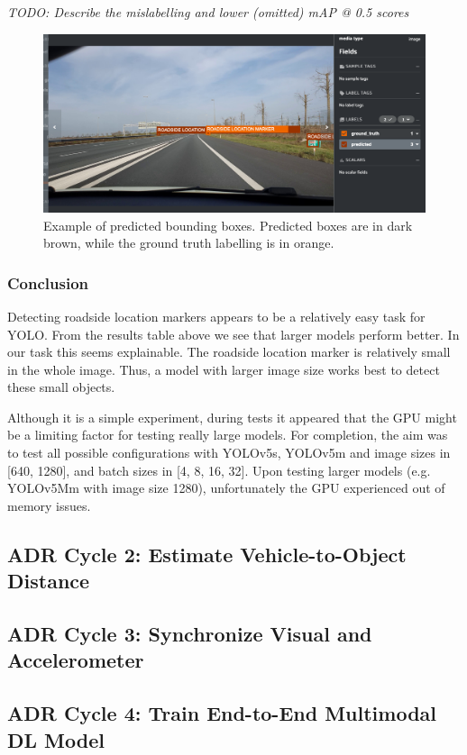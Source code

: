 \textit{TODO: Describe the mislabelling and lower (omitted) mAP @ 0.5 scores}

\begin{figure}[h]
\begin{center}
\includegraphics[width=\textwidth,keepaspectratio]{images/5_multimodal_fusion/exp-1_sample.png}
\end{center}
\caption{Example of predicted bounding boxes. Predicted boxes are in dark brown, while the ground truth labelling is in orange.}
\end{figure}

\subsubsection{Conclusion}

Detecting roadside location markers appears to be a relatively easy task for YOLO. From the results table above we see that larger models perform better. In our task this seems explainable. The roadside location marker is relatively small in the whole image. Thus, a model with larger image size works best to detect these small objects.

Although it is a simple experiment, during tests it appeared that the GPU might be a limiting factor for testing really large models. For completion, the aim was to test all possible configurations with YOLOv5s, YOLOv5m and image sizes in [640, 1280], and batch sizes in [4, 8, 16, 32]. Upon testing larger models (e.g. YOLOv5Mm with image size 1280), unfortunately the GPU experienced out of memory issues.


\subsection{ADR Cycle 2: Estimate Vehicle-to-Object Distance }

\subsection{ADR Cycle 3: Synchronize Visual and Accelerometer}

\subsection{ADR Cycle 4: Train End-to-End Multimodal DL Model}








